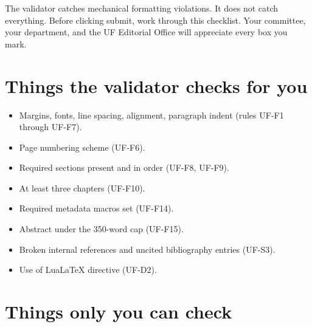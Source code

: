 The validator catches mechanical formatting violations. It does not
catch everything. Before clicking submit, work through this checklist.
Your committee, your department, and the UF Editorial Office will
appreciate every box you mark.

\section{Things the validator checks for you}

\begin{itemize}
    \item Margins, fonts, line spacing, alignment, paragraph indent
          (rules UF-F1 through UF-F7).
    \item Page numbering scheme (UF-F6).
    \item Required sections present and in order (UF-F8, UF-F9).
    \item At least three chapters (UF-F10).
    \item Required metadata macros set (UF-F14).
    \item Abstract under the 350-word cap (UF-F15).
    \item Broken internal references and uncited bibliography entries
          (UF-S3).
    \item Use of LuaLaTeX directive (UF-D2).
\end{itemize}

\section{Things only you can check}

